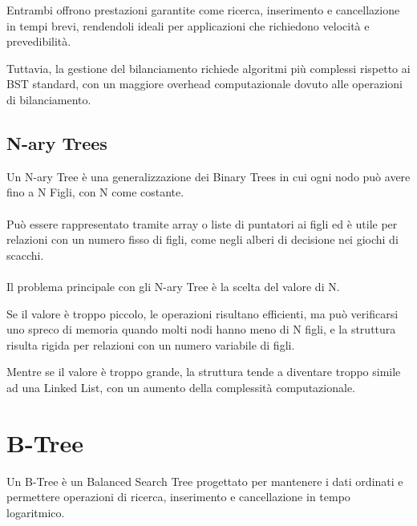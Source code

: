 \documentclass[12pt,a4paper,openright,twoside]{book}
\begin{document}
            Entrambi offrono prestazioni garantite come ricerca, inserimento e cancellazione in tempi brevi, rendendoli ideali per applicazioni che richiedono velocità e prevedibilità.

            Tuttavia, la gestione del bilanciamento richiede algoritmi più complessi rispetto ai BST standard, con un maggiore overhead computazionale dovuto alle operazioni di bilanciamento.

        \subsection{N-ary Trees}

            Un N-ary Tree è una generalizzazione dei Binary Trees in cui ogni nodo può avere fino a N Figli, con N come costante.

            \paragraph*{}

            Può essere rappresentato tramite array o liste di puntatori ai figli ed è utile per relazioni con un numero fisso di figli, come negli alberi di decisione nei giochi di scacchi.

            \paragraph*{}

            Il problema principale con gli N-ary Tree è la scelta del valore di N.

            Se il valore è troppo piccolo, le operazioni risultano efficienti, ma può verificarsi uno spreco di memoria quando molti nodi hanno meno di N figli, e la struttura risulta rigida per relazioni con un numero variabile di figli.

            Mentre se il valore è troppo grande, la struttura tende a diventare troppo simile ad una Linked List, con un aumento della complessità computazionale.

        \cite{cormen2022introduction}

    \section{B-Tree}

        Un B-Tree è un Balanced Search Tree progettato per mantenere i dati ordinati e permettere operazioni di ricerca, inserimento e cancellazione in tempo logaritmico.
\end{document}
